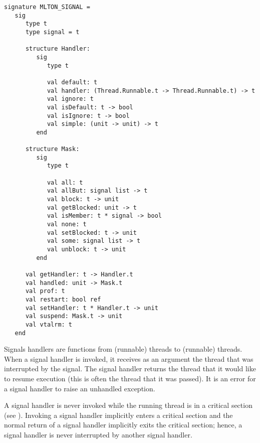 \begin{verbatim}
signature MLTON_SIGNAL =
   sig
      type t
      type signal = t

      structure Handler:
         sig
            type t

            val default: t
            val handler: (Thread.Runnable.t -> Thread.Runnable.t) -> t
            val ignore: t
            val isDefault: t -> bool
            val isIgnore: t -> bool
            val simple: (unit -> unit) -> t
         end

      structure Mask:
         sig
            type t
               
            val all: t
            val allBut: signal list -> t
            val block: t -> unit
            val getBlocked: unit -> t
            val isMember: t * signal -> bool
            val none: t
            val setBlocked: t -> unit
            val some: signal list -> t
            val unblock: t -> unit
         end

      val getHandler: t -> Handler.t
      val handled: unit -> Mask.t
      val prof: t
      val restart: bool ref
      val setHandler: t * Handler.t -> unit
      val suspend: Mask.t -> unit
      val vtalrm: t
   end
\end{verbatim}

Signals handlers are functions from (runnable) threads to (runnable)
threads.  When a signal handler is invoked, it receives as an argument
the thread that was interrupted by the signal.  The signal handler
returns the thread that it would like to resume execution (this is
often the thread that it was passed).  It is an error for a signal
handler to raise an unhandled exception.

A signal handler is never invoked while the running thread is in a
critical section (see ).  Invoking a signal handler
implicitly enters a critical section and the normal return of a signal
handler implicitly exits the critical section; hence, a signal handler
is never interrupted by another signal handler.

